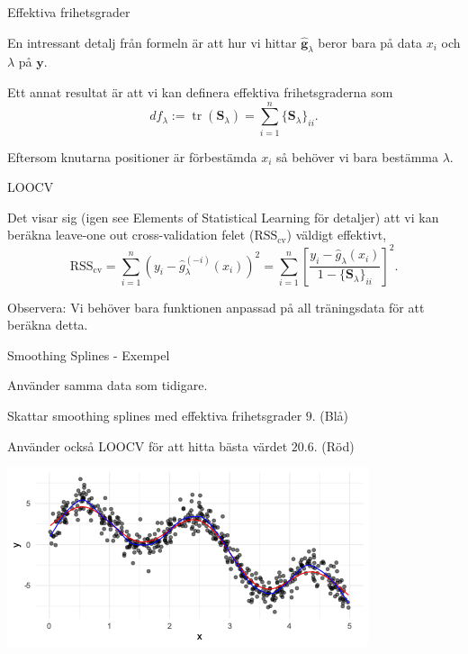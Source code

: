 \documentclass[10pt,english]{beamer}
\begin{document}
\begin{frame}{Effektiva frihetsgrader}

    En intressant detalj från formeln är att hur vi hittar $\hat{\mathbf{g}}_{\lambda}$ beror bara på data $x_i$ och $\lambda$  på $\mathbf{y}$.

    Ett annat resultat är att vi kan definera effektiva frihetsgraderna som
    \begin{equation*}
        df_{\lambda} := \operatorname{tr}(\mathbf{S}_{\lambda}) = \sum_{i=1}^{n} \{\mathbf{S}_{\lambda}\}_{ii}.
    \end{equation*}

    Eftersom knutarna positioner är förbestämda $x_i$ så behöver vi bara bestämma $\lambda$.

\end{frame}

\begin{frame}{LOOCV}

    Det visar sig (igen see Elements of Statistical Learning för detaljer) att vi kan beräkna leave-one out cross-validation felet ($\text{RSS}_{\text{cv}}$) väldigt effektivt,
    \begin{equation*}
        \operatorname{RSS_{\text{cv}}} = \sum_{i=1}^{n}(y_i - \hat{g}_{\lambda}^{(-i)}(x_i))^2 = \sum_{i=1}^{n}\left[ \frac{y_i - \hat{g}_{\lambda}(x_i)}{1 - \{\mathbf{S}_{\lambda}\}_{ii}} \right]^2.
    \end{equation*}
    
    Observera: Vi behöver bara funktionen anpassad på all träningsdata för att beräkna detta.

\end{frame}

\begin{frame}{Smoothing Splines - Exempel}
    
    Använder samma data som tidigare.

    Skattar smoothing splines med effektiva frihetsgrader $9$. (Blå)

    Använder också LOOCV för att hitta bästa värdet $20.6$. (Röd)

    \includegraphics[width=\textwidth]{figs/bestCV.png}

\end{frame}
\end{document}
